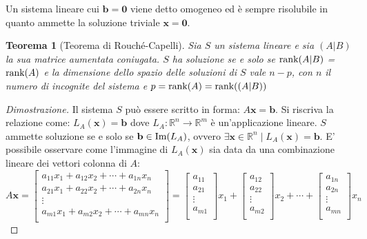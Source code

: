 \documentclass{article}
\newtheorem{theorem}{Teorema}
\begin{document}
    Un sistema lineare cui $\mathbf{b} = \mathbf{0}$ viene detto omogeneo ed è sempre risolubile in quanto ammette la soluzione triviale $\mathbf{x} = \mathbf{0}$.

    \vspace{10pt}
    \begin{theorem}[Teorema di Rouché-Capelli] 
        Sia $S$ un sistema lineare e sia $(A | B)$ la sua matrice aumentata coniugata. $S$ ha soluzione se e solo se 
        $\textnormal{rank}(A | B)$ = $\textnormal{rank}(A)$ e la dimensione dello spazio delle soluzioni di $S$ vale $n - p$,
        con $n$ il numero di incognite del sistema e $p = \textnormal{rank}(A) = \textnormal{rank}((A | B))$
    \end{theorem}

    \begin{proof}[Dimostrazione] 
        Il sistema $S$ può essere scritto in forma: $A\mathbf{x} = \mathbf{b}$. Si riscriva la relazione come: $L_A(\mathbf{x}) = \mathbf{b}$ dove $L_A: \mathbb{R}^n \rightarrow \mathbb{R}^m$ è un'applicazione lineare.
        $S$ ammette soluzione se e solo se $\mathbf{b} \in \textnormal{Im}(L_A)$, ovvero $\exists \mathbf{x} \in \mathbb{R}^n \; | \; L_A(\mathbf{x}) = \mathbf{b}$. E' possibile osservare come l'immagine di $L_A(\mathbf{x})$
        sia data da una combinazione lineare dei vettori colonna di $A$:
        \[
            A\mathbf{x} = 
            \begin{bmatrix}
                a_{11}x_{1} + a_{12}x_{2} + \cdots + a_{1n}x_{n} \\
                a_{21}x_{1} + a_{22}x_{2} + \cdots + a_{2n}x_{n} \\
                \vdots \\
                a_{m1}x_{1} + a_{m2}x_{2} + \cdots + a_{mn}x_{n} \\
            \end{bmatrix}
            = 
            \begin{bmatrix}
                a_{11} \\
                a_{21} \\
                \vdots \\
                a_{m1} \\
            \end{bmatrix}
            x_{1}
            + 
            \begin{bmatrix}
                a_{12} \\
                a_{22} \\
                \vdots \\
                a_{m2} \\
            \end{bmatrix}
            x_{2}
            +
            \cdots
            +
            \begin{bmatrix}
                a_{1n} \\
                a_{2n} \\
                \vdots \\
                a_{mn} \\
            \end{bmatrix}
            x_{n}
        \]    


\end{proof}
\end{document}
